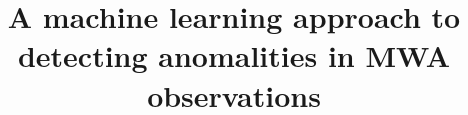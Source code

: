 \documentclass[linenumbers,trackchanges]{aastex701}
\begin{document}
\title{A machine learning approach to detecting anomalities in MWA observations}

\end{document}
